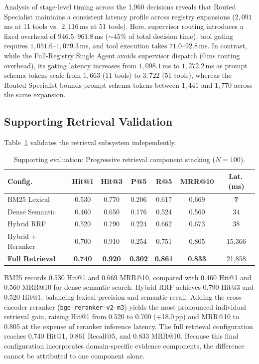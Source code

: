 Analysis of stage-level timing across the 1,960 decisions reveals that Routed Specialist maintains a consistent latency profile across registry expansions ($2{,}091$\,ms at 11 tools vs.\ $2{,}116$\,ms at 51 tools). Here, supervisor routing introduces a fixed overhead of $946.5$--$961.8$\,ms (${\sim}45$\% of total decision time), tool gating requires $1{,}051.6$--$1{,}079.3$\,ms, and tool execution takes $71.0$--$92.8$\,ms. In contrast, while the Full-Registry Single Agent avoids supervisor dispatch ($0$\,ms routing overhead), its gating latency increases from $1{,}098.1$\,ms to $1{,}272.2$\,ms as prompt schema tokens scale from $1{,}663$ (11 tools) to $3{,}722$ (51 tools), whereas the Routed Specialist bounds prompt schema tokens between $1{,}441$ and $1{,}770$ across the same expansion.

\subsection{Supporting Retrieval Validation}
\label{sec:retrieval_results}

Table~\ref{tab:retrieval_evaluation} validates the retrieval subsystem independently.

\begin{table}[!htbp]
\centering
\caption{Supporting evaluation: Progressive retrieval component stacking ($N=100$).}
\label{tab:retrieval_evaluation}
{\small\setlength{\tabcolsep}{3pt}
\begin{tabular}{lcccccc}
\toprule
\textbf{Config.} & \textbf{Hit@1} & \textbf{Hit@3} & \textbf{P@5} & \textbf{R@5} & \textbf{MRR@10} & \textbf{Lat.\,(ms)} \\
\midrule
BM25 Lexical          & 0.530 & 0.770 & 0.206 & 0.617 & 0.669 & \textbf{7} \\
Dense Semantic        & 0.460 & 0.650 & 0.176 & 0.524 & 0.560 & 34 \\
Hybrid RRF            & 0.520 & 0.790 & 0.224 & 0.662 & 0.673 & 38 \\
Hybrid + Reranker     & 0.700 & 0.910 & 0.254 & 0.751 & 0.805 & 15{,}366 \\
\textbf{Full Retrieval} & \textbf{0.740} & \textbf{0.920} & \textbf{0.302} & \textbf{0.861} & \textbf{0.833} & 21{,}858 \\
\bottomrule
\end{tabular}}
\end{table}

BM25 records 0.530 Hit@1 and 0.669 MRR@10, compared with 0.460 Hit@1 and 0.560 MRR@10 for dense semantic search. Hybrid RRF achieves 0.790 Hit@3 and 0.520 Hit@1, balancing lexical precision and semantic recall. Adding the cross-encoder reranker (\texttt{bge-reranker-v2-m3}) yields the most pronounced individual retrieval gain, raising Hit@1 from 0.520 to 0.700 (+18.0\,pp) and MRR@10 to 0.805 at the expense of reranker inference latency. The full retrieval configuration reaches 0.740 Hit@1, 0.861 Recall@5, and 0.833 MRR@10. Because this final configuration incorporates domain-specific evidence components, the difference cannot be attributed to one component alone.

